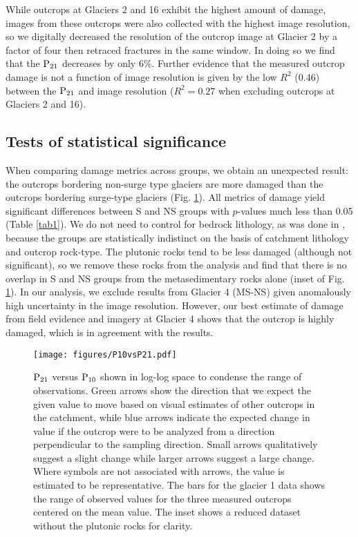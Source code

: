 \documentclass[review]{igs}
\begin{document}
While outcrops at Glaciers 2 and 16 exhibit the highest amount of damage, images from these outcrops were also collected with the highest image resolution, so we digitally decreased the resolution of the outcrop image at Glacier 2 by a factor of four then retraced fractures in the same window. In doing so we find that the $\rm P_{21}$ decreases by only 6\%. Further evidence that the measured outcrop damage is not a function of image resolution is given by the low $R^2$ (0.46) between the $\rm P_{21}$ and image resolution ($R^2=0.27$ when excluding outcrops at Glaciers 2 and 16). 

\subsection{Tests of statistical significance}

When comparing damage metrics across groups, we obtain an unexpected result: the outcrops bordering non-surge type glaciers are more damaged than the outcrops bordering surge-type glaciers (Fig. \ref{fig1}). All metrics of damage yield significant differences between S and NS groups with $p$-values much less than 0.05 (Table \ref{tab1}). We do not need to control for bedrock lithology, as was done in \cite{Crompton2016}, because the groups are statistically indistinct on the basis of catchment lithology and outcrop rock-type. The plutonic rocks tend to be less damaged (although not significant), so we remove these rocks from the analysis and find that there is no overlap in S and NS groups from the metasedimentary rocks alone (inset of Fig. \ref{fig1}). In our analysis, we exclude results from Glacier 4 (MS-NS) given anomalously high uncertainty in the image resolution. However, our best estimate of damage from field evidence and imagery at Glacier 4 shows that the outcrop is highly damaged, which is in agreement with the results. 

\begin{figure}[H]
  \centering
  \texttt{[image: figures/P10vsP21.pdf]}
  \caption[]{$\rm P_{21}$ versus $\rm P_{10}$ shown in log-log space to condense the range of observations. Green arrows show the direction that we expect the given value to move based on visual estimates of other outcrops in the catchment, while blue arrows indicate the expected change in value if the outcrop were to be analyzed from a direction perpendicular to the sampling direction. Small arrows qualitatively suggest a slight change while larger arrows suggest a large change. Where symbols are not associated with arrows, the value is estimated to be representative. The bars for the glacier 1 data shows the range of observed values for the three measured outcrops centered on the mean value. The inset shows a reduced dataset without the plutonic rocks for clarity.}
\label{fig1}
\end{figure}
\end{document}
